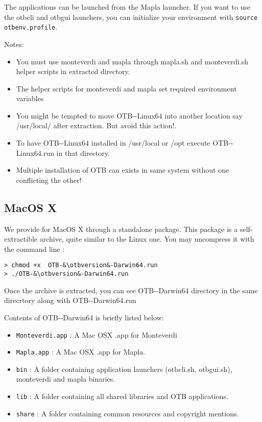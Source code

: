 The applications can be launched from the Mapla launcher. If you want to use
the otbcli and otbgui launchers, you can initialize your environment
with \verb?source otbenv.profile?.

Notes:
\begin{itemize}
\item You must use monteverdi and mapla through mapla.sh and monteverdi.sh helper scripts in extracted directory.
\item The helper scripts for monteverdi and mapla set required environment variables
\item You might be tempted to move OTB-\otbversion-Linux64 into another location say /usr/local/ after extraction. But avoid this action!.
\item To have OTB-\otbversion-Linux64 installed in /usr/local or /opt execute OTB-\otbversion-Linux64.run  in that directory.
\item Multiple installation of OTB can exists in same system without one conflicting the other!
\end{itemize}

\subsection{MacOS X}

We provide \app for MacOS X through a standalone package. This package is a
self-extractible archive, quite similar to the Linux one. You may uncompress
it with the command line :


\begin{lstlisting}[frame=none,numbers=none]
> chmod +x  OTB-&\otbversion&-Darwin64.run
> ./OTB-&\otbversion&-Darwin64.run
\end{lstlisting}

Once the archive is extracted,  you can see OTB-\otbversion-Darwin64 directory in the same direcrtory along with OTB-\otbversion-Darwin64.run

Contents of OTB-\otbversion-Darwin64 is briefly listed below:
\begin{itemize}
\item \verb?Monteverdi.app? : A Mac OSX .app for Monteverdi
\item \verb?Mapla.app? : A Mac OSX .app for Mapla.
\item \verb?bin? : A folder containing application launchers (otbcli\textunderscore *.sh,
otbgui\textunderscore *.sh), monteverdi and mapla binaries.
\item \verb?lib?  : A folder containing all shared libraries and OTB applications.
\item \verb?share? : A folder containing common resources and copyright mentions.
\end{itemize}

